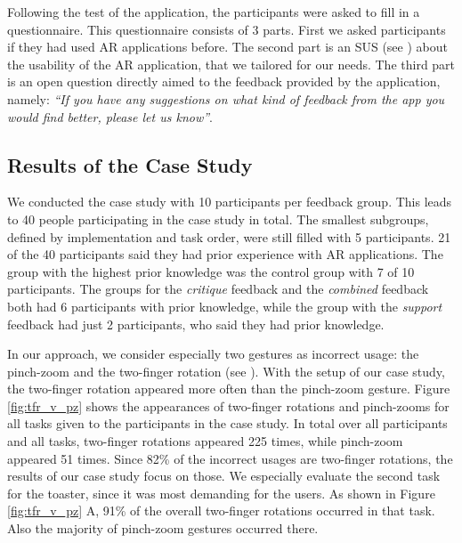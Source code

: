 \documentclass[11pt, a4paper]{article}
\begin{document}
			Following the test of the application, the participants were asked to fill in a questionnaire. This questionnaire consists of 3 parts. First we asked participants if they had used \ac{AR} applications before. The second part is an \ac{SUS} (see ) about the usability of the \ac{AR} application, that we tailored for our needs. The third part is an open question directly aimed to the feedback provided by the application, namely: \emph{``If you have any suggestions on what kind of feedback from the app you would find better, please let us know''}.

		\subsection*{Results of the Case Study}\label{ssec:results}

			We conducted the case study with 10 participants per feedback group. This leads to 40 people participating in the case study in total. The smallest subgroups, defined by implementation and task order, were still filled with 5 participants. 21 of the 40 participants said they had prior experience with \ac{AR} applications. The group with the highest prior knowledge was the control group with 7 of 10 participants. The groups for the \emph{critique} feedback and the \emph{combined} feedback both had 6 participants with prior knowledge, while the group with the \emph{support} feedback had just 2 participants, who said they had prior knowledge.

			In our approach, we consider especially two gestures as incorrect usage: the pinch-zoom and the two-finger rotation (see ). With the setup of our case study, the two-finger rotation appeared more often than the pinch-zoom gesture. Figure \ref{fig:tfr_v_pz} shows the appearances of two-finger rotations and pinch-zooms for all tasks given to the participants in the case study. In total over all participants and all tasks, two-finger rotations appeared 225 times, while pinch-zoom appeared 51 times. Since 82\% of the incorrect usages are two-finger rotations, the results of our case study focus on those. We especially evaluate the second task for the toaster, since it was most demanding for the users. As shown in Figure \ref{fig:tfr_v_pz} A, 91\% of the overall two-finger rotations occurred in that task. Also the majority of pinch-zoom gestures occurred there.
\end{document}
